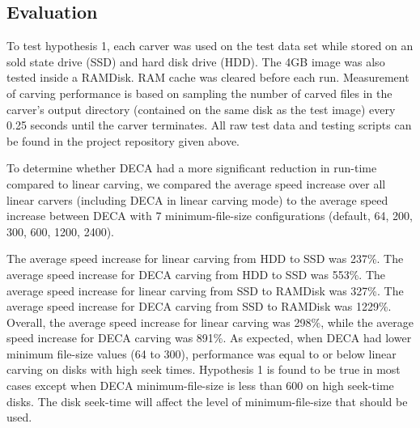 \documentclass[final,5p,times,twocolumn,authoryear]{elsarticle}
\begin{document}
\subsection{Evaluation}
To test hypothesis 1, each carver was used on the test data set while stored on an sold state drive (SSD) and hard disk drive (HDD). The 4GB image was also tested inside a RAMDisk. RAM cache was cleared before each run. Measurement of carving performance is based on sampling the number of carved files in the carver's output directory (contained on the same disk as the test image) every 0.25 seconds until the carver terminates. All raw test data and testing scripts can be found in the project repository given above.

To determine whether DECA had a more significant reduction in run-time compared to linear carving, we compared the average speed increase over all linear carvers (including DECA in linear carving mode) to the average speed increase between DECA with 7 minimum-file-size configurations (default, 64, 200, 300, 600, 1200, 2400).

The average speed increase for linear carving from HDD to SSD was 237\%. The average speed increase for DECA carving from HDD to SSD was 553\%. The average speed increase for linear carving from SSD to RAMDisk was 327\%. The average speed increase for DECA carving from SSD to RAMDisk was 1229\%. Overall, the average speed increase for linear carving was 298\%, while the average speed increase for DECA carving was 891\%. As expected, when DECA had lower minimum file-size values (64 to 300), performance was equal to or below linear carving on disks with high seek times. Hypothesis 1 is found to be true in most cases except when DECA minimum-file-size is less than 600 on high seek-time disks. The disk seek-time will affect the level of minimum-file-size that should be used.

%
\end{document}
